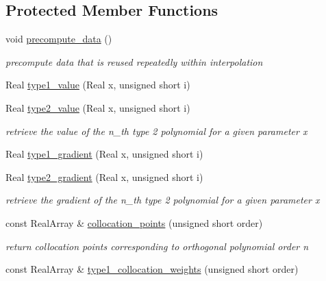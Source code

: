 \subsection*{Protected Member Functions}
\begin{DoxyCompactItemize}
\item 
void \hyperlink{classPecos_1_1PiecewiseInterpPolynomial_a9a5fd3dc945d15c8423dc66dcd137b4f}{precompute\+\_\+data} ()\label{classPecos_1_1PiecewiseInterpPolynomial_a9a5fd3dc945d15c8423dc66dcd137b4f}

\begin{DoxyCompactList}\small\item\em precompute data that is reused repeatedly within interpolation \end{DoxyCompactList}\item 
Real \hyperlink{classPecos_1_1PiecewiseInterpPolynomial_abb79c6ea3bd58a7ca9c4b3bfdd85be9c}{type1\+\_\+value} (Real x, unsigned short i)
\item 
Real \hyperlink{classPecos_1_1PiecewiseInterpPolynomial_a49797f1037329fbe0a40f13dc23149e1}{type2\+\_\+value} (Real x, unsigned short i)
\begin{DoxyCompactList}\small\item\em retrieve the value of the n\+\_\+th type 2 polynomial for a given parameter x \end{DoxyCompactList}\item 
Real \hyperlink{classPecos_1_1PiecewiseInterpPolynomial_a005465761c081a210eef9879ec5686f8}{type1\+\_\+gradient} (Real x, unsigned short i)
\item 
Real \hyperlink{classPecos_1_1PiecewiseInterpPolynomial_a069b51a84ab3c4a6e635e07b3c8dcfe7}{type2\+\_\+gradient} (Real x, unsigned short i)
\begin{DoxyCompactList}\small\item\em retrieve the gradient of the n\+\_\+th type 2 polynomial for a given parameter x \end{DoxyCompactList}\item 
const Real\+Array \& \hyperlink{classPecos_1_1PiecewiseInterpPolynomial_a10873b28f1284aff4ea214e00c4f86dd}{collocation\+\_\+points} (unsigned short order)
\begin{DoxyCompactList}\small\item\em return collocation points corresponding to orthogonal polynomial order n \end{DoxyCompactList}\item 
const Real\+Array \& \hyperlink{classPecos_1_1PiecewiseInterpPolynomial_aa010321cf47465dca5725fa15ba58bf6}{type1\+\_\+collocation\+\_\+weights} (unsigned short order)

\end{DoxyCompactItemize}
